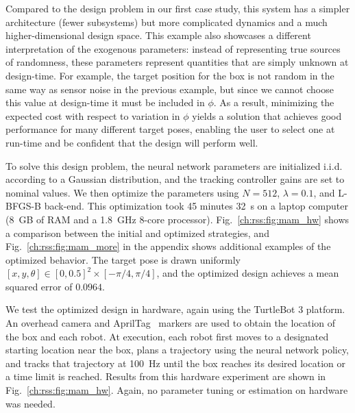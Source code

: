 
Compared to the design problem in our first case study, this system has a simpler architecture (fewer subsystems) but more complicated dynamics and a much higher-dimensional design space. This example also showcases a different interpretation of the exogenous parameters: instead of representing true sources of randomness, these parameters represent quantities that are simply unknown at design-time. For example, the target position for the box is not random in the same way as sensor noise in the previous example, but since we cannot choose this value at design-time it must be included in $\phi$. As a result, minimizing the expected cost with respect to variation in $\phi$ yields a solution that achieves good performance for many different target poses, enabling the user to select one at run-time and be confident that the design will perform well.

To solve this design problem, the neural network parameters are initialized i.i.d. according to a Gaussian distribution, and the tracking controller gains are set to nominal values. We then optimize the parameters using $N = 512$, $\lambda = 0.1$, and L-BFGS-B back-end. This optimization took 45 minutes \SI{32}{s} on a laptop computer (\SI{8}{GB} of RAM and a \SI{1.8}{GHz} 8-core processor). Fig.~\ref{ch:rss:fig:mam_hw} shows a comparison between the initial and optimized strategies, and Fig.~\ref{ch:rss:fig:mam_more} in the appendix shows additional examples of the optimized behavior. The target pose is drawn uniformly $[x, y, \theta] \in[0, 0.5]^2 \times [-\pi/4, \pi/4]$, and the optimized design achieves a mean squared error of $0.0964$.

We test the optimized design in hardware, again using the TurtleBot 3 platform. An overhead camera and AprilTag~\cite{olson2011tags} markers are used to obtain the location of the box and each robot. At execution, each robot first moves to a designated starting location near the box, plans a trajectory using the neural network policy, and tracks that trajectory at \SI{100}{Hz} until the box reaches its desired location or a time limit is reached. Results from this hardware experiment are shown in Fig.~\ref{ch:rss:fig:mam_hw}. Again, no parameter tuning or estimation on hardware was needed.

